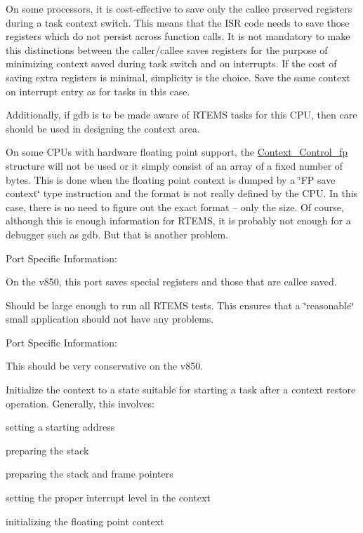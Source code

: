 On some processors, it is cost-\/effective to save only the callee preserved registers during a task context switch. This means that the I\+SR code needs to save those registers which do not persist across function calls. It is not mandatory to make this distinctions between the caller/callee saves registers for the purpose of minimizing context saved during task switch and on interrupts. If the cost of saving extra registers is minimal, simplicity is the choice. Save the same context on interrupt entry as for tasks in this case.

Additionally, if gdb is to be made aware of R\+T\+E\+MS tasks for this C\+PU, then care should be used in designing the context area.

On some C\+P\+Us with hardware floating point support, the \mbox{\hyperlink{structContext__Control__fp}{Context\+\_\+\+Control\+\_\+fp}} structure will not be used or it simply consist of an array of a fixed number of bytes. This is done when the floating point context is dumped by a \char`\"{}\+F\+P save context\char`\"{} type instruction and the format is not really defined by the C\+PU. In this case, there is no need to figure out the exact format -- only the size. Of course, although this is enough information for R\+T\+E\+MS, it is probably not enough for a debugger such as gdb. But that is another problem.

Port Specific Information\+:

On the v850, this port saves special registers and those that are callee saved.

Should be large enough to run all R\+T\+E\+MS tests. This ensures that a \char`\"{}reasonable\char`\"{} small application should not have any problems.

Port Specific Information\+:

This should be very conservative on the v850.

Initialize the context to a state suitable for starting a task after a context restore operation. Generally, this involves\+:


\begin{DoxyItemize}
\item setting a starting address
\item preparing the stack
\item preparing the stack and frame pointers
\item setting the proper interrupt level in the context
\item initializing the floating point context
\end{DoxyItemize}

